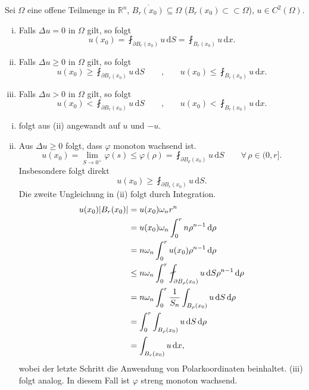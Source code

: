 \begin{korollar}[Mittelwerteigenschaft]
	Sei $\Omega$ eine offene Teilmenge in $\mathbb{R}^n$, $\overline{B_r(x_0)} \subseteq \Omega$ ($B_r(x_0) \subset \subset \Omega$), $u \in C^2(\Omega)$.
	\begin{enumerate}[(i)]
		\item Falls $ \Delta u = 0 $ in $\Omega$ gilt, so folgt
		\begin{equation}
			u(x_0) = \fint_{\partial B_r(x_0)}^{} u \,\mathrm{d}S = \fint_{B_r(x_0)}^{} u 	\,\mathrm{d}x.
		\end{equation}
		\item Falls $\Delta u \geq 0$ in $\Omega$ gilt, so folgt
		\begin{equation}
			u(x_0) \geq \fint_{\partial B_r(x_0)}^{} u \,\mathrm{d}S \qquad \text{,} \qquad u(x_0) \leq \fint_{B_r(x_0)}^{}u \,\mathrm{d}x.
		\end{equation}
		\item Falls $\Delta u > 0$ in $\Omega$ gilt, so folgt
		\begin{equation}
			u(x_0) < \fint_{\partial B_r(x_0)}^{} u\,\mathrm{d}S \qquad \text{,} \qquad u(x_0) < \fint_{B_r(x_0)}^{} u \,\mathrm{d}x.
		\end{equation}
	\end{enumerate}
	\end{korollar}
	\begin{beweis}
		\begin{enumerate}[(i)]
			\item folgt aus (ii) angewandt auf $u$ und $-u$.
			\item Aus $\Delta u \geq 0$ folgt, dass $\varphi$ monoton wachsend ist.
			\begin{equation}
				u(x_0) = \lim_{S \to 0^+} \varphi(s) \leq \varphi(\rho) = \fint_{\partial B_{\rho}(x_0)}^{}u \,\mathrm{d}S \qquad \forall\, \rho \in (0,r].
			\end{equation}
			Insbesondere folgt direkt
			\[
				u(x_0) \geq \fint_{\partial B_r(x_0)}^{}u \,\mathrm{d}S.
			\]
			Die zweite Ungleichung in (ii) folgt durch Integration.
			\begin{align*}
				u(x_0)\abs{B_r(x_0)} &= u(x_0) \omega_n r^n \\ &= u(x_0) \omega_n \int_{0}^{r}n \rho^{n-1} \,\mathrm{d}\rho \\ 
				&= n\omega_n \int_{0}^{r}u(x_0)\rho^{n-1} \,\mathrm{d}\rho  \\
				&\leq n \omega_n \int_{0}^{r}\fint_{\partial B_{\rho}(x_0)}^{} u \,\mathrm{d}S \rho^{n-1} \,\mathrm{d}\rho \\
				&= n \omega_n \int_{0}^{r} \frac{1}{S_n} \int_{B_{\rho}(x_0)}^{} u \,\mathrm{d}S \,\mathrm{d}\rho \\
				&= \int_{0}^{r} \int_{B_{\rho}(x_0)}^{}u \,\mathrm{d}S \,\mathrm{d}\rho \\
				&= \int_{B_{r}(x_0)}^{}u \,\mathrm{d}x,
			\end{align*}
			wobei der letzte Schritt die Anwendung von Polarkoordinaten beinhaltet. (iii) folgt analog. In diesem Fall ist $\varphi$ streng monoton wachsend.
			\end{enumerate}
	\end{beweis}

